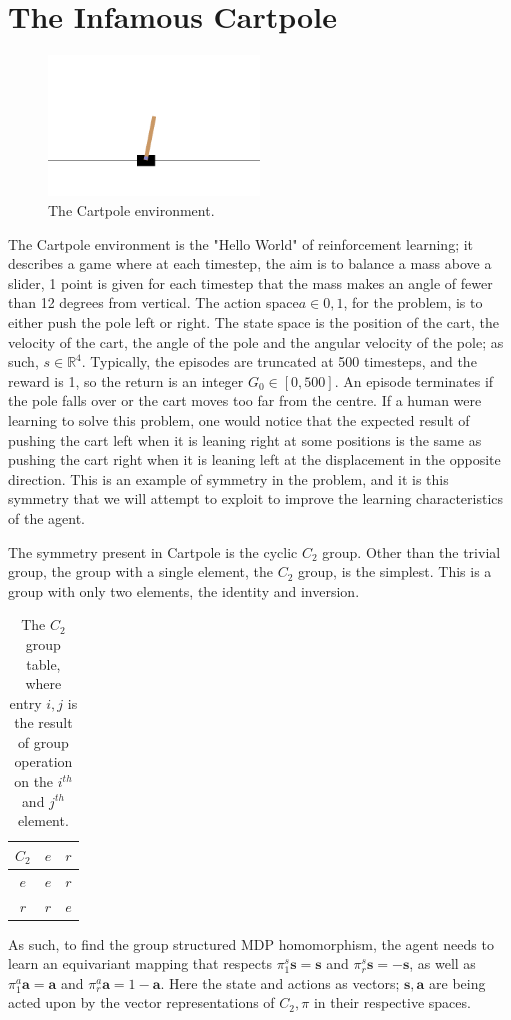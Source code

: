 \section{The Infamous Cartpole}
\begin{figure}[h!]
	\centering
	\includegraphics[width=0.5\textwidth]{Figures/cart_pole.png}
	\caption{The Cartpole environment.}
\end{figure}
The Cartpole environment is the "Hello World" of reinforcement learning; it describes a game where at each timestep, the aim is to balance a mass above a slider, 1 point is given for each timestep that the mass makes an angle of fewer than 12 degrees from vertical. The action space$a \in {0,1}$, for the problem, is to either push the pole left or right. The state space is the position of the cart, the velocity of the cart, the angle of the pole and the angular velocity of the pole; as such, $s \in \mathbb{R}^4$. Typically, the episodes are truncated at 500 timesteps, and the reward is 1, so the return is an integer $G_0 \in [0, 500]$. An episode terminates if the pole falls over or the cart moves too far from the centre. If a human were learning to solve this problem, one would notice that the expected result of pushing the cart left when it is leaning right at some positions is the same as pushing the cart right when it is leaning left at the displacement in the opposite direction. This is an example of symmetry in the problem, and it is this symmetry that we will attempt to exploit to improve the learning characteristics of the agent.

The symmetry present in Cartpole is the cyclic $C_2$ group. Other than the trivial group, the group with a single element, the $C_2$ group, is the simplest. This is a group with only two elements, the identity and inversion.
\begin{table}[h!]
	\centering
	\begin{tabular}{c | c  c}
		$C_2$ & $e$ & $r$ \\
		\hline
		$e$   & $e$ & $r$ \\
		$r$   & $r$ & $e$
	\end{tabular}
	\caption{The $C_2$ group table, where entry $i, j$ is the result of group operation on the $i^{th}$ and $j^{th}$ element.}
\end{table}


As such, to find the group structured MDP homomorphism, the agent needs to learn an equivariant mapping that respects $\pi_1^s\mathbf{s} = \mathbf{s}$ and $\pi_r^s\mathbf{s} = -\mathbf{s}$, as well as $\pi_1^a\mathbf{a} = \mathbf{a}$ and $\pi_r^a\mathbf{a} = 1 - \mathbf{a}$. Here the state and actions as vectors; $\mathbf{s}, \mathbf{a}$ are being acted upon by the vector representations of $C_2, \pi$ in their respective spaces.

